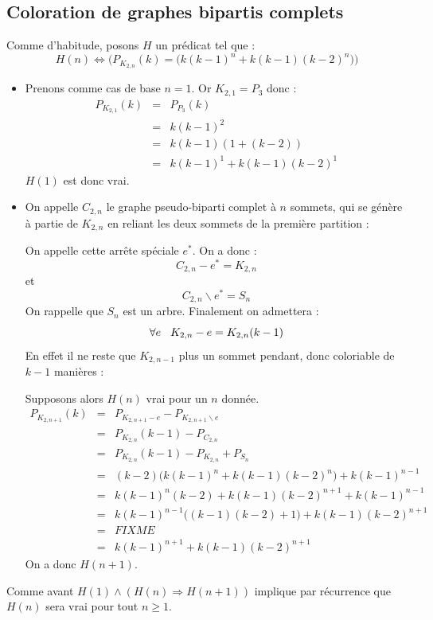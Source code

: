 \subsection{Coloration de graphes bipartis complets}
Comme d'habitude, posons $H$ un prédicat tel que : 
\[ H(n) \Leftrightarrow \Big(P_{K_{2,n}}(k) = \big(k(k-1)^n + k(k-1)(k-2)^n\big)\Big) \]
\begin{itemize}
\item Prenons comme cas de base $n = 1$. Or $K_{2,1} = P_3$ donc :
\begin{eqnarray*}
P_{K_{2,1}}(k)			& = & P_{P_3}(k)				\\
						& = & k(k-1)^2					\\
						& = & k(k-1)(1 + (k-2))			\\
						& = & k(k-1)^1 + k(k-1)(k-2)^1	
\end{eqnarray*}
$H(1)$ est donc vrai.
\item On appelle $C_{2,n}$ le graphe pseudo-biparti complet à $n$ sommets, qui se génère à partie de $K_{2,n}$ en reliant les deux sommets de la première partition :



On appelle cette arrête spéciale $e^*$. On a donc :
\[ C_{2,n}-e^* = K_{2,n} \]
et
\[ C_{2,n} \backslash{e^*} = S_n \]
On rappelle que $S_n$ est un arbre. Finalement on admettera :
\[ \forall{e} \hspace{3mm} K_{2,n}-e = K_{2,n}(k-1) \]
En effet il ne reste que $K_{2,n-1}$ plus un sommet pendant, donc coloriable de $k-1$ manières :

Supposons alors $H(n)$ vrai pour un $n$ donnée. 
\begin{eqnarray*}
P_{K_{2,n+1}}(k)			& = & P_{K_{2,n+1}-e} - P_{K_{2,n+1} \backslash{e}}				\\
							& = & P_{K_{2,n}}(k-1) - P_{C_{2,n}}							\\
							& = & P_{K_{2,n}}(k-1) - P_{K_{2,n}} + P_{S_n}					\\
							& = & (k-2)\big(k(k-1)^n + k(k-1)(k-2)^n\big) + k(k-1)^{n-1}	\\
							& = & k(k-1)^n(k-2) + k(k-1)(k-2)^{n+1} + k(k-1)^{n-1}			\\
							& = & k(k-1)^{n-1}\big((k-1)(k-2) + 1\big) + k(k-1)(k-2)^{n+1}	\\
							& = & FIXME														\\
							& = & k(k-1)^{n+1} + k(k-1)(k-2)^{n+1}
\end{eqnarray*}
On a donc $H(n+1)$.
\end{itemize}
Comme avant $H(1) \wedge (H(n) \Rightarrow H(n+1))$ implique par récurrence que $H(n)$ sera vrai pour tout $n \geq 1$.

